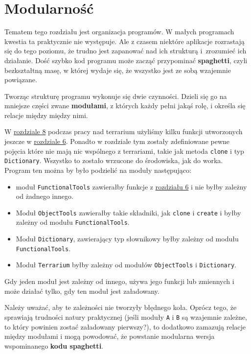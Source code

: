 \chapter{Modularność}
\label{chap:9}

  
Tematem tego rozdziału jest organizacja programów. W małych programach kwestia ta praktycznie nie występuje. Ale z czasem niektóre aplikacje rozrastają się do tego poziomu, że trudno jest zapanować nad ich strukturą i~zrozumieć ich działanie. Dość szybko kod programu może zacząć przypominać \textbf{spaghetti}, czyli bezkształtną masę, w której wydaje się, że wszystko jest ze sobą wzajemnie powiązane.

  
Tworząc strukturę programu wykonuje się dwie czynności. Dzieli się go na mniejsze części zwane \textbf{modułami}, z których każdy pełni jakąś rolę, i określa się relacje między między nimi.

  
W \hyperref[chap:8]{rozdziale 8} podczas pracy nad terrarium użyliśmy kilku funkcji utworzonych jeszcze w \hyperref[chap:6]{rozdziale 6}. Ponadto w rozdziale tym zostały zdefiniowane pewne pojęcia które nie mają nic wspólnego z terrariami, takie jak metoda \texttt{clone} i typ \texttt{Dictionary}. Wszystko to zostało wrzucone do środowiska, jak do worka. Program ten można by było podzielić na moduły następująco:

\begin{itemize}
    \item moduł \texttt{FunctionalTools} zawierałby funkcje z \hyperref[chap:6]{rozdziału 6} i nie byłby zależny od żadnego innego.
    \item Moduł \texttt{ObjectTools} zawierałby takie składniki, jak \texttt{clone} i \texttt{create} i byłby zależny od modułu \texttt{FunctionalTools}.
    \item Moduł \texttt{Dictionary}, zawierający typ słownikowy byłby zależny od modułu \texttt{FunctionalTools}.
    \item Moduł \texttt{Terrarium} byłby zależny od modułów \texttt{ObjectTools} i \texttt{Dictionary}.
\end{itemize}
  
Gdy jeden moduł jest zależny od innego, używa jego funkcji lub zmiennych i może działać tylko, gdy ten moduł jest załadowany.

  
Należy uważać, aby te zależności nie tworzyły błędnego koła. Oprócz tego, że sprawiają trudności natury praktycznej (jeśli moduły \texttt{A} i \texttt{B} są wzajemnie zależne, to który powinien zostać załadowany pierwszy?), to dodatkowo zamazują relacje między modułami i mogą powodować, że powstanie modularna wersja wspominanego \textbf{kodu spaghetti}.




